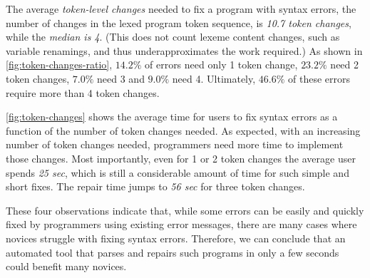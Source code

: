 %
The average \emph{token-level changes} needed to fix a program with syntax
errors, \ie the number of changes in the lexed program token sequence, is
\emph{10.7 token changes}, while the \emph{median is 4}.
%
(This does not count lexeme content changes, such as variable renamings,
and thus underapproximates the work required.)
%
As shown in \autoref{fig:token-changes-ratio}, $14.2\%$ of errors
need only 1 token change, $23.2\%$ need 2 token changes, $7.0\%$
need 3 and $9.0\%$ need 4.
Ultimately, $46.6\%$ of these errors require more than 4 token changes.
%

%
\autoref{fig:token-changes} shows the average time for users to fix
syntax errors as a function of the number of token changes needed.
As expected, with an increasing number of token changes needed,
programmers need more time to implement those changes. Most importantly, even
for 1 or 2 token changes the average user spends \emph{25 sec},
which is still a considerable amount of time for such simple and
short fixes. The repair time jumps to \emph{56 sec} for three token changes.

\smallskip
These four observations indicate that, while some errors can be
easily and quickly fixed by programmers using existing error messages,
there are many cases where novices struggle with fixing syntax errors.
%
Therefore, we can conclude that an automated tool that parses and repairs
such programs in only a few seconds could benefit many novices.
